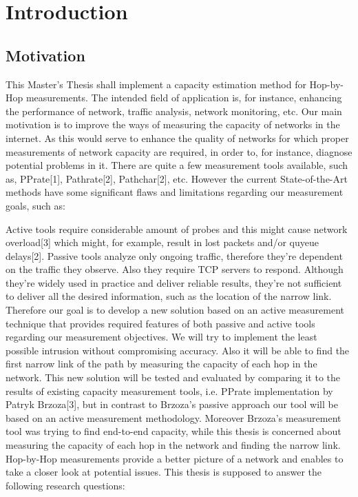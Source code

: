 \chapter{Introduction}

\section{Motivation}
This Master’s Thesis shall implement a capacity estimation method for Hop-by-Hop measurements. The intended
field of application is, for instance, enhancing the performance of network, traffic analysis, network
monitoring, etc. Our main motivation is to improve the ways of measuring the capacity of networks in the
internet. As this would serve to enhance the quality of networks for which proper measurements of network
capacity are required, in order to, for instance, diagnose potential problems in it.
There are quite a few measurement tools available, such as, PPrate[1], Pathrate[2], Pathchar[2], etc. However
the current State-of-the-Art methods have some significant flaws and limitations regarding our measurement
goals, such as:

Active tools require considerable amount of probes and this might cause network overload[3] which
might, for example, result in lost packets and/or quyeue delays[2].
Passive tools analyze only ongoing traffic, therefore they’re dependent on the traffic they observe.
Also they require TCP servers to respond. Although they’re widely used in practice and deliver reliable
results, they’re not sufficient to deliver all the desired information, such as the location of the narrow
link.
Therefore our goal is to develop a new solution based on an active measurement technique that provides
required features of both passive and active tools regarding our measurement objectives. We will try to implement
the least possible intrusion without compromising accuracy. Also it will be able to find the first narrow
link of the path by measuring the capacity of each hop in the network. This new solution will be tested and
evaluated by comparing it to the results of existing capacity measurement tools, i.e. PPrate implementation
by Patryk Brzoza[3], but in contrast to Brzoza’s passive approach our tool will be based on an active measurement
methodology. Moreover Brzoza’s measurement tool was trying to find end-to-end capacity, while
this thesis is concerned about measuring the capacity of each hop in the network and finding the narrow link.
Hop-by-Hop measurements provide a better picture of a network and enables to take a closer look at potential
issues. This thesis is supposed to answer the following research questions:


